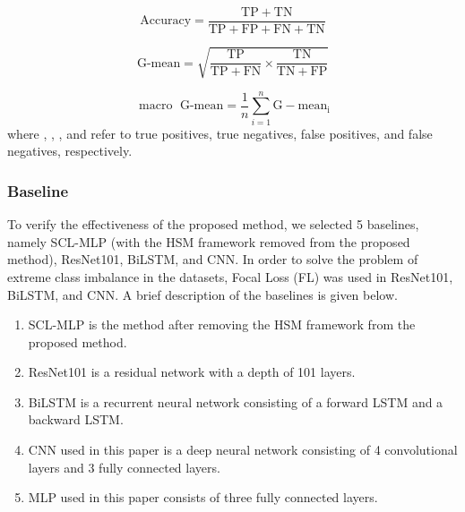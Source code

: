 \documentclass[lettersize,journal]{IEEEtran}
\begin{document}
\begin{equation}
\text{Accuracy} = \frac{\mathrm{TP}+\mathrm{TN}}{\mathrm{TP+FP+FN+TN}}
\label{acc}
\end{equation}

\begin{equation}
\text{G-mean} = \sqrt{ \frac{\mathrm{TP}}{\mathrm{TP+FN}} \times \frac{\mathrm{TN}}{\mathrm{TN+FP}}}
\label{gmean}
\end{equation}

\begin{equation}
\operatorname{macro} \text{ G-mean}=\frac{1}{n} \sum_{i=1}^n \mathrm{G-mean_i}
\label{macrogmean}
\end{equation}
where , , , and  refer to true positives, true negatives, false positives, and false negatives, respectively.

\subsubsection{Baseline}%

To verify the effectiveness of the proposed method, we selected 5 baselines, namely SCL-MLP (with the HSM framework removed from the proposed method), ResNet101, BiLSTM, and CNN. In order to solve the problem of extreme class imbalance in the datasets, Focal Loss (FL) \cite{lin2017focal} was used in ResNet101, BiLSTM, and CNN. A brief description of the baselines is given below.

\begin{enumerate}%
\item SCL-MLP is the method after removing the HSM framework from the proposed method.
\item ResNet101 is a residual network with a depth of 101 layers.
\item BiLSTM is a recurrent neural network consisting of a forward LSTM and a backward LSTM.
\item CNN used in this paper is a deep neural network consisting of 4 convolutional layers and 3 fully connected layers.
\item MLP used in this paper consists of three fully connected layers.
\end{enumerate}
\end{document}
